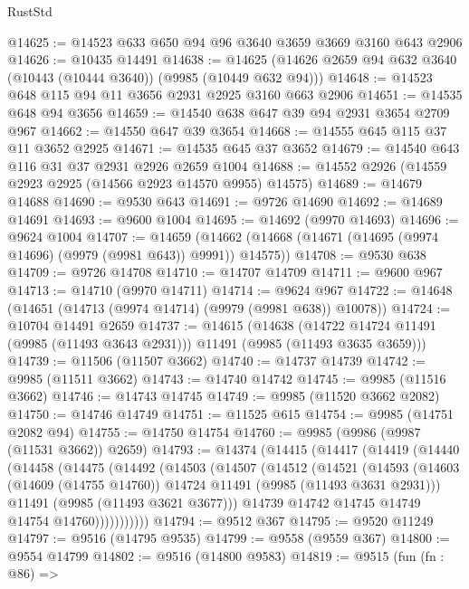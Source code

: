 \begin{lexlean}{RustStd}
\begin{coremodule}
@14625 := @14523 @633 @650 @94 @96 @3640 @3659 @3669 @3160 @643 @2906
@14626 := @10435 @14491
@14638 := @14625 (@14626 @2659 @94 @632 @3640 (@10443 (@10444 @3640)) (@9985 (@10449 @632 @94)))
@14648 := @14523 @648 @115 @94 @11 @3656 @2931 @2925 @3160 @663 @2906
@14651 := @14535 @648 @94 @3656
@14659 := @14540 @638 @647 @39 @94 @2931 @3654 @2709 @967
@14662 := @14550 @647 @39 @3654
@14668 := @14555 @645 @115 @37 @11 @3652 @2925
@14671 := @14535 @645 @37 @3652
@14679 := @14540 @643 @116 @31 @37 @2931 @2926 @2659 @1004
@14688 := @14552 @2926 (@14559 @2923 @2925 (@14566 @2923 @14570 @9955) @14575)
@14689 := @14679 @14688
@14690 := @9530 @643
@14691 := @9726 @14690
@14692 := @14689 @14691
@14693 := @9600 @1004
@14695 := @14692 (@9970 @14693)
@14696 := @9624 @1004
@14707 := @14659
    (@14662 (@14668 (@14671 (@14695 (@9974 @14696) (@9979 (@9981 @643)) @9991)) @14575))
@14708 := @9530 @638
@14709 := @9726 @14708
@14710 := @14707 @14709
@14711 := @9600 @967
@14713 := @14710 (@9970 @14711)
@14714 := @9624 @967
@14722 := @14648 (@14651 (@14713 (@9974 @14714) (@9979 (@9981 @638)) @10078))
@14724 := @10704 @14491 @2659
@14737 := @14615
    (@14638 (@14722 @14724 @11491 (@9985 (@11493 @3643 @2931))) @11491 (@9985 (@11493 @3635 @3659)))
@14739 := @11506 (@11507 @3662)
@14740 := @14737 @14739
@14742 := @9985 (@11511 @3662)
@14743 := @14740 @14742
@14745 := @9985 (@11516 @3662)
@14746 := @14743 @14745
@14749 := @9985 (@11520 @3662 @2082)
@14750 := @14746 @14749
@14751 := @11525 @615
@14754 := @9985 (@14751 @2082 @94)
@14755 := @14750 @14754
@14760 := @9985 (@9986 (@9987 (@11531 @3662)) @2659)
@14793 := @14374
    (@14415
      (@14417
        (@14419
          (@14440
            (@14458
              (@14475
                (@14492
                  (@14503
                    (@14507
                      (@14512
                        (@14521
                          (@14593
                            (@14603
                              (@14609 (@14755 @14760))
                              @14724
                              @11491
                              (@9985 (@11493 @3631 @2931)))
                            @11491
                            (@9985 (@11493 @3621 @3677)))
                          @14739
                          @14742
                          @14745
                          @14749
                          @14754
                          @14760)))))))))))
@14794 := @9512 @367
@14795 := @9520 @11249
@14797 := @9516 (@14795 @9535)
@14799 := @9558 (@9559 @367)
@14800 := @9554 @14799
@14802 := @9516 (@14800 @9583)
@14819 := @9515
    (fun (fn : @86) =>

\end{coremodule}
\end{lexlean}
